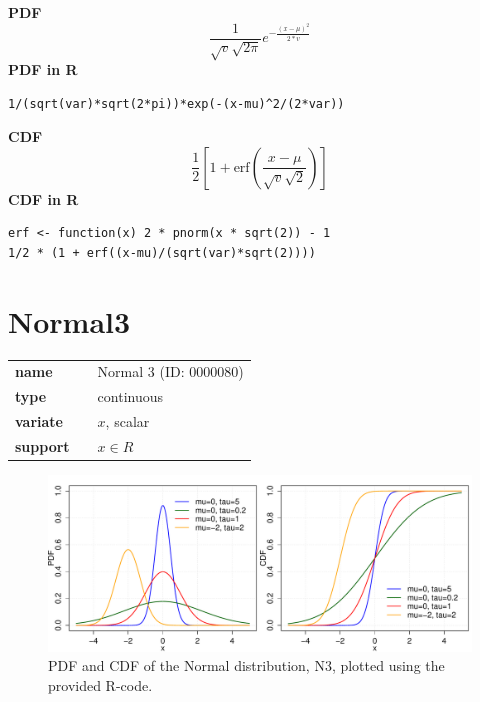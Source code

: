 \smallskip \noindent \hspace{.2cm} \textbf{PDF} 
\begin{equation*}\frac{1}{\sqrt{v} \sqrt{2 \pi}}e^{-\frac{(x-\mu)^2}{2*v}}\end{equation*}
\smallskip \noindent \hspace{.2cm} \textbf{PDF in R}  
\begin{verbatim}1/(sqrt(var)*sqrt(2*pi))*exp(-(x-mu)^2/(2*var))\end{verbatim}
\smallskip \noindent \hspace{.2cm} \textbf{CDF} 
\begin{equation*}\frac12\left[1 + \text{erf}\left( \frac{x-\mu}{\sqrt{v}\sqrt{2}}\right)\right]\end{equation*}
\smallskip \noindent \hspace{.2cm} \textbf{CDF in R} 
\begin{verbatim}
erf <- function(x) 2 * pnorm(x * sqrt(2)) - 1
1/2 * (1 + erf((x-mu)/(sqrt(var)*sqrt(2))))\end{verbatim}
\smallskip\section*{Normal3} 

  \bigskip 

\begin{tabular}{p{2cm}cl}
\textbf{name} & & Normal 3 (ID: 0000080)\\ 
 
\textbf{type} & & continuous \\ 

\textbf{variate} & & $x$, scalar \\ 

\textbf{support} & & $x \in R$
\end{tabular}

\begin{figure}[htb!]
\centering
  \includegraphics[width=140mm]{pics/Normal3_pdf_cdf.pdf}
 \caption{PDF and CDF of the Normal distribution, N3,
 plotted using the provided R-code.}
 \label{fig:N3pdfcdf}
\end{figure}

